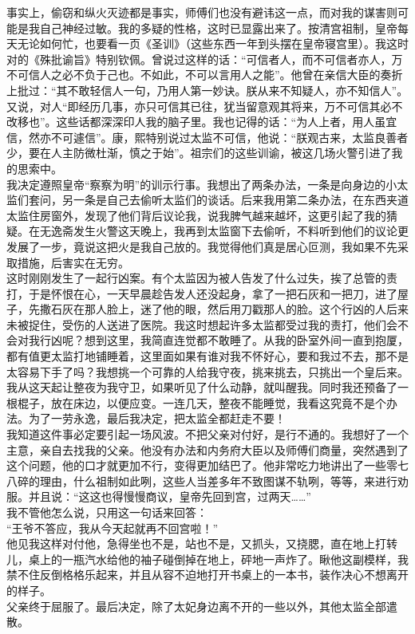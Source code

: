 事实上，偷窃和纵火灭迹都是事实，师傅们也没有避讳这一点，而对我的谋害则可能是我自己神经过敏。我的多疑的性格，这时已显露出来了。按清宫祖制，皇帝每天无论如何忙，也要看一页《圣训》（这些东西一年到头摆在皇帝寝宫里）。我这时对的《殊批谕旨》特别钦佩。曾说过这样的话：“可信者人，而不可信者亦人，万不可信人之必不负于己也。不如此，不可以言用人之能”。他曾在亲信大臣的奏折上批过：“其不敢轻信人一句，乃用人第一妙诀。朕从来不知疑人，亦不知信人”。又说，对人“即经历几事，亦只可信其已往，犹当留意观其将来，万不可信其必不改移也”。这些话都深深印人我的脑子里。我也记得的话：“为人上者，用人虽宜信，然亦不可遽信”。康，熙特别说过太监不可信，他说：“朕观古来，太监良善者少，要在人主防微杜渐，慎之于始”。祖宗们的这些训谕，被这几场火警引进了我的思索中。\\

我决定遵照皇帝“察察为明”的训示行事。我想出了两条办法，一条是向身边的小太监们套问，另一条是自己去偷听太监们的谈话。后来我用第二条办法，在东西夹道太监住房窗外，发现了他们背后议论我，说我脾气越来越坏，这更引起了我的猜疑。在无逸斋发生火警这天晚上，我再到太监窗下去偷听，不料听到他们的议论更发展了一步，竟说这把火是我自己放的。我觉得他们真是居心叵测，我如果不先采取措施，后害实在无穷。\\

这时刚刚发生了一起行凶案。有个太监因为被人告发了什么过失，挨了总管的责打，于是怀恨在心，一天早晨趁告发人还没起身，拿了一把石灰和一把刀，进了屋子，先撒石灰在那人脸上，迷了他的眼，然后用刀戳那人的脸。这个行凶的人后来未被捉住，受伤的人送进了医院。我这时想起许多太监都受过我的责打，他们会不会对我行凶呢？想到这里，我简直连觉都不敢睡了。从我的卧室外间一直到抱厦，都有值更太监打地铺睡着，这里面如果有谁对我不怀好心，要和我过不去，那不是太容易下手了吗？我想挑一个可靠的人给我守夜，挑来挑去，只挑出一个皇后来。我从这天起让整夜为我守卫，如果听见了什么动静，就叫醒我。同时我还预备了一根棍子，放在床边，以便应变。一连几天，整夜不能睡觉，我看这究竟不是个办法。为了一劳永逸，最后我决定，把太监全都赶走不要！\\

我知道这件事必定要引起一场风波。不把父亲对付好，是行不通的。我想好了一个主意，亲自去找我的父亲。他没有办法和内务府大臣以及师傅们商量，突然遇到了这个问题，他的口才就更加不行，变得更加结巴了。他非常吃力地讲出了一些零七八碎的理由，什么祖制如此咧，这些人当差多年不致图谋不轨咧，等等，来进行劝服。并且说：“这这也得慢慢商议，皇帝先回到宫，过两天……”\\

我不管他怎么说，只用这一句话来回答：\\

“王爷不答应，我从今天起就再不回宫啦！”\\

他见我这样对付他，急得坐也不是，站也不是，又抓头，又挠腮，直在地上打转儿，桌上的一瓶汽水给他的袖子碰倒掉在地上，砰地一声炸了。瞅他这副模样，我禁不住反倒格格乐起来，并且从容不迫地打开书桌上的一本书，装作决心不想离开的样子。\\

父亲终于屈服了。最后决定，除了太妃身边离不开的一些以外，其他太监全部遣散。\\

